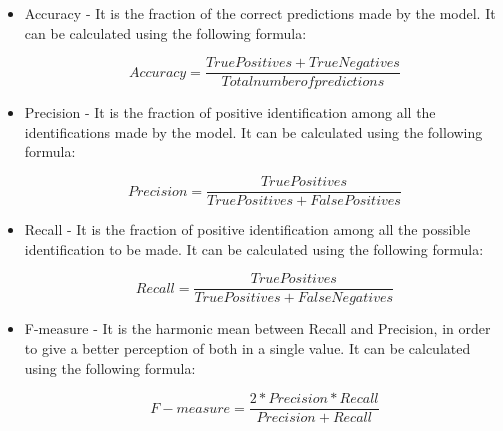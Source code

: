 \begin{itemize}
    \item Accuracy - It is the fraction of the correct predictions made by the model.
    It can be calculated using the following formula:

    \begin{equation}
    Accuracy = \frac{True Positives + True Negatives}{Total number of predictions}
    \label{eqn:Accuracy}
    \end{equation}

    \item Precision - It is the fraction of positive identification among all the identifications made by the model.
    It can be calculated using the following formula:

    \begin{equation}
    Precision = \frac{True Positives}{True Positives + False Positives}
    \label{eqn:Precision}
    \end{equation}

    \item Recall - It is the fraction of positive identification among all the possible identification to be made.
    It can be calculated using the following formula:

    \begin{equation}
    Recall = \frac{True Positives}{True Positives + False Negatives}
    \label{eqn:Recall}
    \end{equation}

    \item F-measure - It is the harmonic mean between Recall and Precision, in order to give a better perception of both in a single value.
    It can be calculated using the following formula:

    \begin{equation}
    F-measure = \frac{2*{Precision}*{Recall}}{Precision + Recall}
    \label{eqn:F-measure}
    \end{equation}

\end{itemize}
